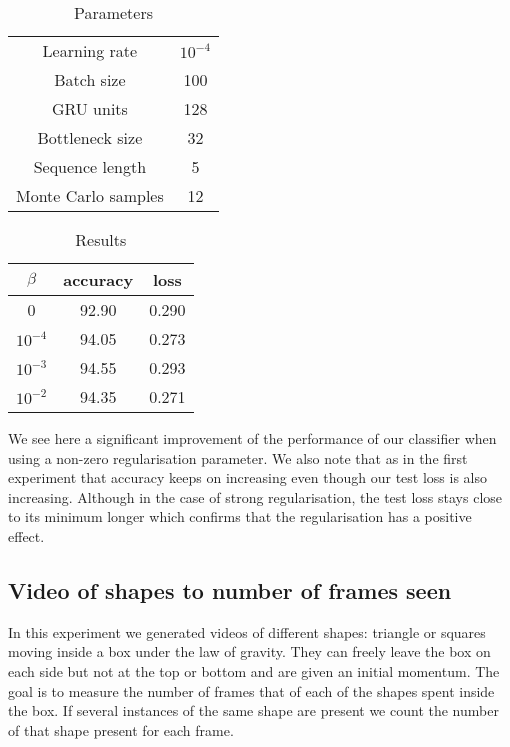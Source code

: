 \documentclass[10pt,oneside,openright]{report}
\begin{document}
\begin {table}[H]
\begin{center}
\begin{tabular}{ c | c  }
 Learning rate & $10^{-4}$ \\
 Batch size & 100\\
 GRU units & 128 \\
 Bottleneck size & 32 \\
 Sequence length & 5 \\
 Monte Carlo samples & 12
\end{tabular}
\end{center}
\caption{Parameters}
\end {table}

\begin {table}[H]
\begin{center}
\begin{tabular}{ c | c c }
 $\beta$ & accuracy & loss \\
 \hline
0 & 92.90 & 0.290 \\
$10^{-4}$ & 94.05 & 0.273 \\
$10^{-3}$ & 94.55 & 0.293 \\
$10^{-2}$ & 94.35 & 0.271 \\
\end{tabular}
\end{center}
\caption{Results}
\end {table}

We see here a significant improvement of the performance of our classifier when using a non-zero regularisation parameter. We also note that as in the first experiment that accuracy keeps on increasing even though our test loss is also increasing. Although in the case of strong regularisation, the test loss stays close to its minimum longer which confirms that the regularisation has a positive effect.

\subsection{Video of shapes to number of frames seen}

In this experiment we generated videos of different shapes: triangle or squares moving inside a box under the law of gravity. They can freely leave the box on each side but not at the top or bottom and are given an initial momentum. The goal is to measure the number of frames that of each of the shapes spent inside the box. If several instances of the same shape are present we count the number of that shape present for each frame. 
\end{document}
